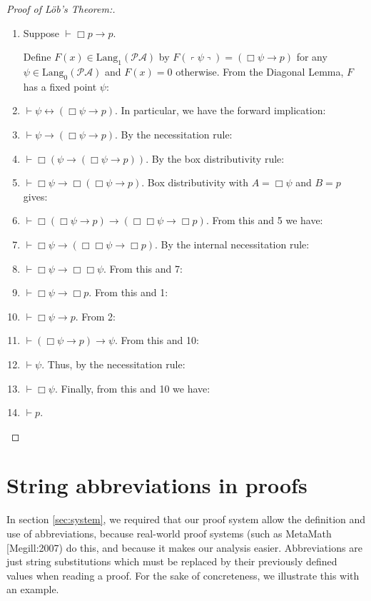 \documentclass[jsl,reqno,bibay2]{asl}
\makeatletter
\numberwithin{equation}{section}
\theoremstyle{definition}
\newcommand{\PA}{\mathcal{P}\!\mathcal{A}}
\newcommand{\Lang}{\mathrm{Lang}}
\newcommand{\qquote}[1]{\left\ulcorner #1 \right\urcorner}
\renewcommand{\-}{^{-1}}
\def\citep{\@ifnextchar[{\@withp}{\@withoutp}}%
\def\@withp[#1]#2{[\!\!\citeauth{#2},~\citeyear[#1]{#2}]}%
\def\@withoutp#1{[\!\!\citeauth{#1},~\citeyear{#1}]}%
\makeatother
\begin{document}
\begin{proof}[Proof of L\"{o}b's Theorem:]\ 

\begin{enumerate}
\item Suppose $\vdash \Box p \rightarrow p$.

Define $F(x) \in \Lang_1(\PA)$ by $F(\qquote\psi) = (\Box \psi \rightarrow p)$ for any $\psi \in \Lang_0(\PA)$ and $F(x) = 0$ otherwise.  From the Diagonal Lemma, $F$ has a fixed point $\psi$:

\item $\vdash \psi \leftrightarrow (\Box \psi \rightarrow p)$.  In particular, we have the forward implication:
\item $\vdash \psi \rightarrow (\Box \psi \rightarrow p)$.  By the necessitation rule:
\item $\vdash \Box(\psi \rightarrow (\Box \psi \rightarrow p))$.  By the box distributivity rule:
\item $\vdash \Box\psi \rightarrow \Box(\Box \psi \rightarrow p)$.  Box distributivity with $ A = \Box \psi $ and $ B= p$ gives:
\item $\vdash \Box(\Box \psi \rightarrow p) \rightarrow (\Box\Box\psi \rightarrow \Box p)$.  From this and 5 we have:
\item $\vdash \Box \psi \rightarrow (\Box\Box\psi \rightarrow \Box p)$.  By the internal necessitation rule:
\item $\vdash \Box \psi \rightarrow \Box \Box \psi$.  From this and 7:
\item $\vdash \Box \psi \rightarrow \Box p$.  From this and 1:
\item $\vdash \Box \psi \rightarrow p$.  From 2:
\item $\vdash (\Box \psi \rightarrow p) \rightarrow \psi$.  From this and 10:
\item $\vdash \psi$.  Thus, by the necessitation rule:
\item $\vdash \Box \psi$.  Finally, from this and 10 we have:
\item $\vdash p$.
\end{enumerate}

\end{proof}


\section{String abbreviations in proofs}

In section \ref{sec:system}, we required that our proof system allow the definition and use of abbreviations, because real-world proof systems (such as MetaMath \citep{Megill:2007}) do this, and because it makes our analysis easier.  Abbreviations are just string substitutions which must be replaced by their previously defined values when reading a proof.  For the sake of concreteness, we illustrate this with an example.
\end{document}
